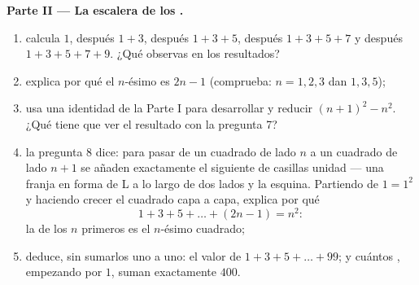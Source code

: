 \begin{problem}[{Problema de fin de semana --- $(a+b)^2$, $(a-b)^2$,
$(a+b)(a-b)$ y la suma $1 + 3 + 5 + \dots + (2n-1) = n^2$}]
\medskip
\noindent\textbf{Parte II --- La escalera de los .}
\begin{enumerate}[resume]
  \item calcula $1$, después $1 + 3$, después $1 + 3 + 5$, después
        $1 + 3 + 5 + 7$ y después $1 + 3 + 5 + 7 + 9$. ¿Qué
        observas en los resultados?
  \item explica por qué el $n$-ésimo  es $2n - 1$ (comprueba:
        $n = 1, 2, 3$ dan $1, 3, 5$);
  \item usa una identidad de la Parte I para desarrollar y reducir
        $(n + 1)^2 - n^2$. ¿Qué tiene que ver el resultado con
        la pregunta 7?
  \item la pregunta 8 dice: para pasar de un cuadrado de lado $n$ a un
        cuadrado de lado $n + 1$ se añaden exactamente el siguiente  de casillas unidad --- una franja en forma de L a lo largo de dos
        lados y la esquina. Partiendo de $1 = 1^2$ y haciendo crecer
        el cuadrado capa a capa, explica por qué
        \[
        1 + 3 + 5 + \dots + (2n - 1) = n^2 :
        \]
        la  de los $n$ primeros  es el $n$-ésimo cuadrado;
  \item deduce, sin sumarlos uno a uno: el valor de
        $1 + 3 + 5 + \dots + 99$; y cuántos , empezando
        por $1$, suman exactamente $400$.
\end{enumerate}


\end{problem}
